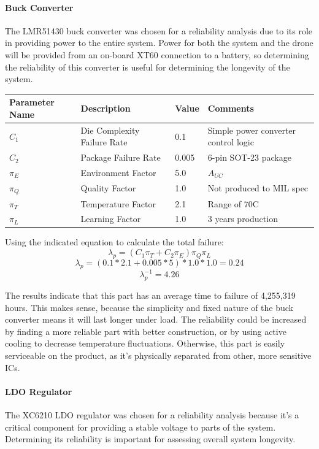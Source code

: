 \documentclass[12pt]{article}
\begin{document}
\paragraph{Buck Converter}
\par The LMR51430 buck converter was chosen for a reliability analysis due to its role in providing power to the entire system. Power for both the system and the drone will be provided from an on-board XT60 connection to a battery, so determining the reliability of this converter is useful for determining the longevity of the system.
\begin{table}[htbp!]
\centering
\begin{tabular}{|l|l|l|l|}
\hline
Parameter Name & Description & Value & Comments \\ \hline
$C_1$ & Die Complexity Failure Rate & 0.1 & Simple power converter control logic \\ \hline
$C_2$ &  Package Failure Rate & 0.005 & 6-pin SOT-23 package \\ \hline
$\pi_E$ & Environment Factor & 5.0 & $A_{UC}$ \\ \hline
$\pi_Q$ & Quality Factor & 1.0 & Not produced to MIL spec \\ \hline
$\pi_T$ & Temperature Factor & 2.1 & Range of 70C \\ \hline
$\pi_L$ & Learning Factor & 1.0 & 3 years production \\ \hline
\end{tabular}
\end{table}
\par Using the indicated equation to calculate the total failure:
\[ \lambda_p = (C_1\pi_T + C_2\pi_E) \pi_Q \pi_L\]
\[ \lambda_p = (0.1*2.1 + 0.005*5) * 1.0 * 1.0 = 0.24\]
\[ \lambda_p^{-1} = 4.26 \]
\par The results indicate that this part has an average time to failure of 4,255,319 hours. This makes sense, because the simplicity and fixed nature of the buck converter means it will last longer under load. The reliability could be increased by finding a more reliable part with better construction, or by using active cooling to decrease temperature fluctuations. Otherwise, this part is easily serviceable on the product, as it's physically separated from other, more sensitive ICs.
\paragraph{LDO Regulator} The XC6210 LDO regulator was chosen for a reliability analysis because it's a critical component for providing a stable voltage to parts of the system.  Determining its reliability is important for assessing overall system longevity.
\end{document}
